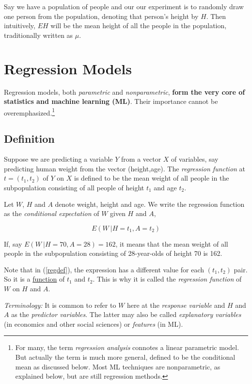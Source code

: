 Say we have a population of people and our our experiment is to 
randomly draw one person from the population, denoting that person's
height by $H$.  Then intuitively, $EH$ will be the mean height of all
the people in the population, traditionally written as $\mu$.

\section{Regression Models} 

Regression models, both \textit{parametric} and \textit{nonparametric},
\textbf{form the very core of statistics and machine learning (ML)}.  Their
importance cannot be overemphasized.\footnote{For many, the term
\textit{regression analysis} connotes a linear parametric model.  But
actually the term is much more general, defined to be the conditional
mean as discussed below.  Most ML techniques are nonparametric, as
explained below, but are still regression methods.}

\subsection{Definition}

Suppose we are predicting a variable $Y$ from a vector $X$ of variables,
say predicting human weight from the vector (height,age).  The
\textit{regression function} at $t = (t_1,t_2)$ of $Y$ on $X$ is defined
to be the mean weight of all people in the subpopulation consisting of
all people of height $t_1$ and age $t_2$.

Let $W$, $H$ and $A$ denote weight, height and age.  We write the
regression function as the \textit{conditional expectation} of $W$ given
$H$ and $A$, 

\begin{equation}
\label{regdef}
E(W ~| H=t_1, A=t_2)
\end{equation}

If, say $E(W ~| H=70, A=28) = 162$, it means that the mean weight of all
people in the subpopulation consisting of 28-year-olds of height 70 is
162.

Note that in (\ref{regdef}), the expression has a different value for
each $(t_1,t_2)$ pair.  So it is a \underline{function} of $t_1$ and
$t_2$.  This is why it is called the \textit{regression function} of $W$ on $H$
and $A$.

\textit{Terminology:} It is common to refer to $W$ here at the
\textit{response variable} and $H$ and $A$ as the \textit{predictor
variables}.  The latter may also be called \textit{explanatory
variables} (in economics and other social sciences) or \textit{features}
(in ML).

